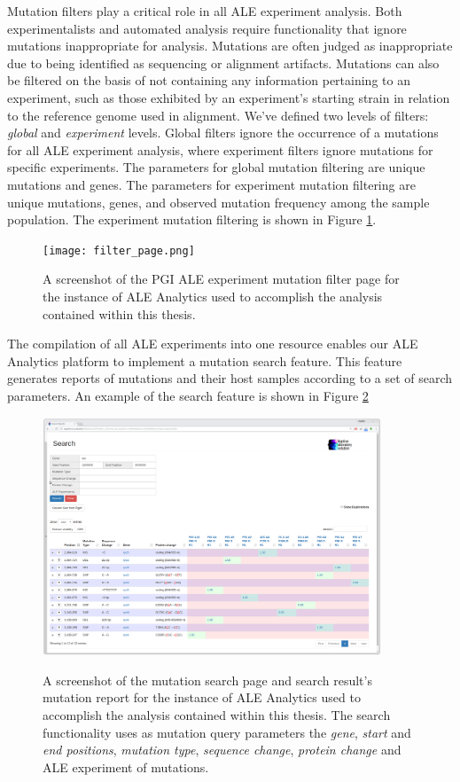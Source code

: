 \documentclass[12pt,final,masters,chapterheads]{ucsd}  %
\begin{document}
Mutation filters play a critical role in all ALE experiment analysis. Both experimentalists and automated analysis require functionality that ignore mutations inappropriate for analysis. Mutations are often judged as inappropriate due to being identified as sequencing or alignment artifacts. Mutations can also be filtered on the basis of not containing any information pertaining to an experiment, such as those exhibited by an experiment's starting strain in relation to the reference genome used in alignment. We've defined two levels of filters: \textit{global} and \textit{experiment} levels. Global filters ignore the occurrence of a mutations for all ALE experiment analysis, where experiment filters ignore mutations for specific experiments. The parameters for global mutation filtering are unique mutations and genes. The parameters for experiment mutation filtering are unique mutations, genes, and observed mutation frequency among the sample population. The experiment mutation filtering is shown in Figure \ref{fig:filter_page}.
\begin{figure}[H]
  \caption{A screenshot of the PGI ALE experiment mutation filter page for the instance of ALE Analytics used to accomplish the analysis contained within this thesis.}
  \centering
  \texttt{[image: filter\_page.png]}
  \label{fig:filter_page}
\end{figure}
The compilation of all ALE experiments into one resource enables our ALE Analytics platform to implement a mutation search feature. This feature generates reports of mutations and their host samples according to a set of search parameters. An example of the search feature is shown in Figure \ref{fig:search_page}
\begin{figure}[H]
  \caption{A screenshot of the mutation search page and search result's mutation report for the instance of ALE Analytics used to accomplish the analysis contained within this thesis. The search functionality uses as mutation query parameters the \textit{gene}, \textit{start} and \textit{end positions}, \textit{mutation type}, \textit{sequence change}, \textit{protein change} and ALE experiment of mutations.}
  \centering
  \includegraphics[width=0.9\textwidth]{search_page.png}
  \label{fig:search_page}
\end{figure}
\end{document}
